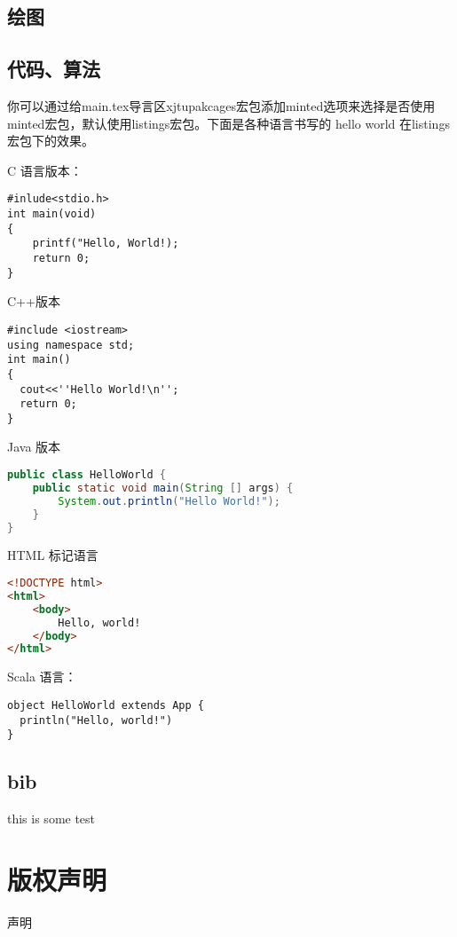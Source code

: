 \documentclass[%
               amsthm,
              ]{xjtubsc}
\begin{document}

\subsection{绘图}

\subsection{代码、算法}

你可以通过给main.tex导言区xjtupakcages宏包添加minted选项来选择是否使用minted宏包，默认使用listings宏包。下面是各种语言书写的 hello world 在listings宏包下的效果。

C 语言版本：
\begin{lstlisting}[language={[ANSI]C}]
#inlude<stdio.h>
int main(void)	
{
    printf("Hello, World!);
    return 0;
}
\end{lstlisting}

C++版本
\begin{lstlisting}[language={[ANSI]C++}]
#include <iostream>
using namespace std;
int main()
{
  cout<<''Hello World!\n'';
  return 0;
}
\end{lstlisting}

Java 版本
\begin{lstlisting}[language={java}]
public class HelloWorld {
    public static void main(String [] args) {
        System.out.println("Hello World!");
    }
}
\end{lstlisting}

HTML 标记语言
\begin{lstlisting}[language=html]
<!DOCTYPE html>
<html>
    <body>
        Hello, world!
    </body>
</html>
\end{lstlisting}

Scala  语言：
\begin{lstlisting}
object HelloWorld extends App {
  println("Hello, world!")
}
\end{lstlisting}

\subsection{bib}

this is some test\cite{IEEE-1363,Krasnogor2004e}
\section{版权声明}
声明
\end{document}
